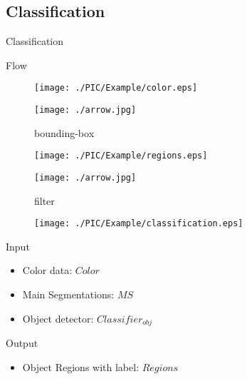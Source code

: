 \documentclass[xcolor=table,compress,blue]{beamer}
\begin{document}
\subsection{Classification}
\begin{frame}{Classification}
	\begin{exampleblock}{Flow}
		\begin{figure}[htpb]
			\centering
			\begin{minipage}[b]{0.8in}
				\centerline{ \texttt{[image: ./PIC/Example/color.eps]} }
			\end{minipage}
			\begin{minipage}[b]{0.8in}
				\centerline{ \texttt{[image: ./arrow.jpg]} }
				\centerline{\tiny{bounding-box}}
			\end{minipage}
			\begin{minipage}[b]{0.8in}
				\centerline{ \texttt{[image: ./PIC/Example/regions.eps]} }
			\end{minipage}
			\begin{minipage}[b]{0.8in}
				\centerline{ \texttt{[image: ./arrow.jpg]} }
				\centerline{\tiny{filter}}
			\end{minipage}
			\begin{minipage}[b]{0.8in}
				\centerline{ \texttt{[image: ./PIC/Example/classification.eps]} }
			\end{minipage}
		\end{figure}
	\end{exampleblock}
	\begin{exampleblock}{Input}
		\begin{itemize}		
			\item Color data: $Color$	
			\item Main Segmentations: $MS$ 
			\item Object detector: ${Classifier}_{obj}$
		\end{itemize}
	\end{exampleblock}
	\begin{exampleblock}{Output}
		\begin{itemize}
			\item Object Regions with label: $Regions$
		\end{itemize}
	\end{exampleblock}
\end{frame}
\end{document}

